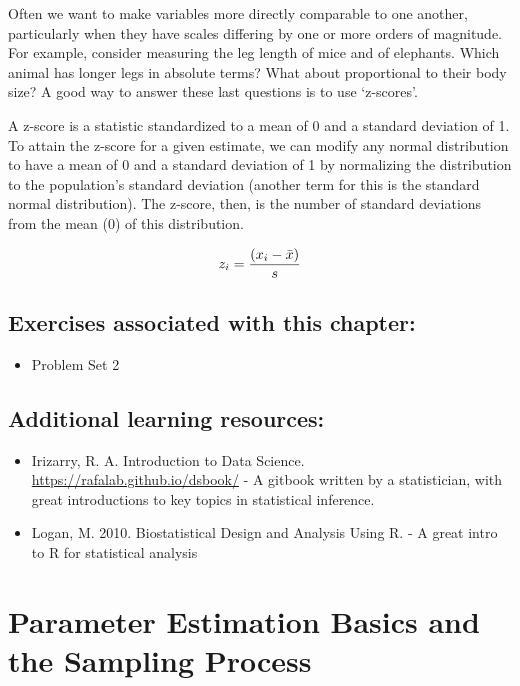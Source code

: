 \documentclass[]{book}
\providecommand{\tightlist}{%
  \setlength{\itemsep}{0pt}\setlength{\parskip}{0pt}}
\begin{document}
Often we want to make variables more directly comparable to one another, particularly when they have scales differing by one or more orders of magnitude. For example, consider measuring the leg length of mice and of elephants. Which animal has longer legs in absolute terms? What about proportional to their body size? A good way to answer these last questions is to use `z-scores'.

A z-score is a statistic standardized to a mean of 0 and a standard deviation of 1. To attain the z-score for a given estimate, we can modify any normal distribution to have a mean of 0 and a standard deviation of 1 by normalizing the distribution to the population's standard deviation (another term for this is the standard normal distribution). The z-score, then, is the number of standard deviations from the mean (0) of this distribution.

\[\huge z_i = \frac{(x_i - \bar{x})}{s}\]

\hypertarget{exercises-associated-with-this-chapter-3}{%
\section{Exercises associated with this chapter:}\label{exercises-associated-with-this-chapter-3}}

\begin{itemize}
\tightlist
\item
  Problem Set 2
\end{itemize}

\hypertarget{additional-learning-resources-3}{%
\section{Additional learning resources:}\label{additional-learning-resources-3}}

\begin{itemize}
\item
  Irizarry, R. A. Introduction to Data Science. \url{https://rafalab.github.io/dsbook/} - A gitbook written by a statistician, with great introductions to key topics in statistical inference.
\item
  Logan, M. 2010. Biostatistical Design and Analysis Using R. - A great intro to R for statistical analysis
\end{itemize}

\hypertarget{parameter-estimation-basics-and-the-sampling-process}{%
\chapter{Parameter Estimation Basics and the Sampling Process}\label{parameter-estimation-basics-and-the-sampling-process}}
\end{document}
